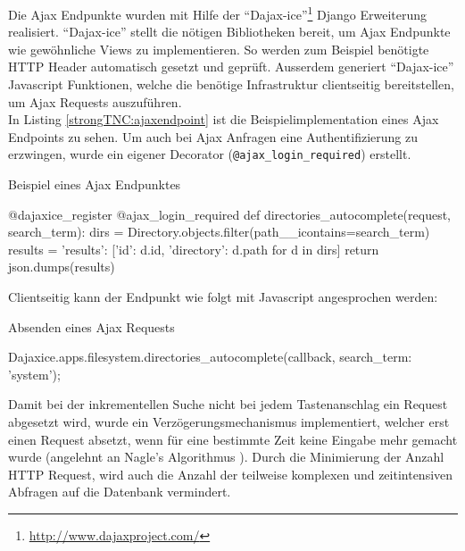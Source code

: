 Die Ajax Endpunkte wurden mit Hilfe der \enquote{Dajax-ice}\footnote{\url{http://www.dajaxproject.com/}} Django Erweiterung realisiert.
\enquote{Dajax-ice} stellt die nötigen Bibliotheken bereit, um Ajax Endpunkte wie gewöhnliche Views zu implementieren. So werden zum Beispiel benötigte HTTP Header
automatisch gesetzt und geprüft. Ausserdem generiert \enquote{Dajax-ice} Javascript Funktionen, welche die benötige Infrastruktur clientseitig bereitstellen, um Ajax Requests auszuführen.
\\

In Listing \ref{strongTNC:ajaxendpoint} ist die Beispielimplementation eines Ajax Endpoints zu sehen. Um auch bei Ajax Anfragen eine Authentifizierung zu erzwingen, wurde ein eigener Decorator (\texttt{@ajax\_login\_required}) erstellt. 
\begin{listing}
\caption{Beispiel eines Ajax Endpunktes}
\label{strongTNC:ajaxendpoint}
\begin{pythoncode}
@dajaxice_register
@ajax_login_required
def directories_autocomplete(request, search_term):
    dirs = Directory.objects.filter(path__icontains=search_term)
    results = {'results': [{'id': d.id, 'directory': d.path} for d in dirs]}
    return json.dumps(results)
\end{pythoncode}
\end{listing}

Clientseitig kann der Endpunkt wie folgt mit Javascript angesprochen werden:
\begin{listing}
\caption{Absenden eines Ajax Requests}
\begin{jscode}
Dajaxice.apps.filesystem.directories_autocomplete(callback, {search_term: 'system'});
\end{jscode} 
\end{listing}

Damit bei der inkrementellen Suche nicht bei jedem Tastenanschlag ein Request
abgesetzt wird, wurde ein Verzögerungsmechanismus implementiert, welcher erst einen Request
absetzt, wenn für eine bestimmte Zeit keine Eingabe mehr gemacht wurde (angelehnt an Nagle's Algorithmus \cite{nagle1984congestion}).
Durch die Minimierung der Anzahl HTTP Request, wird auch die Anzahl der teilweise komplexen und zeitintensiven Abfragen auf die Datenbank vermindert.

